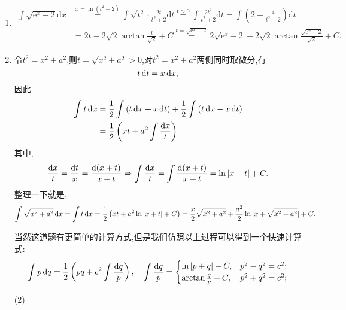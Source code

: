 \begin{solution}
    \begin{enumerate}
        \item \begin{align*}
                  \int \sqrt{\mathrm{e}^x - 2} \mathrm{d}x & \overset{x = \ln(t^2+2)}{=} \int \sqrt{t^2} \cdot \frac{2t}{t^2 + 2} \mathrm{d}t
                  \overset{t>0}{=} \int \frac{2t^2}{t^2 + 2} \mathrm{d}t = \int \left(2 - \frac{4}{t^2 + 2}\right) \mathrm{d}t                \\
                                                           & = 2t - 2\sqrt{2} \arctan \frac{t}{\sqrt{2}} + C
                  \overset{t = \sqrt{\mathrm{e}^x - 2}}{=} 2\sqrt{\mathrm{e}^x - 2} - 2\sqrt{2} \arctan \frac{\sqrt{\mathrm{e}^x - 2}}{\sqrt{2}} + C.
              \end{align*}
        \item 令$t^2 = x^2 + a^2$,则$t = \sqrt{x^2 + a^2}>0$,对$t^2 = x^2 + a^2$两侧同时取微分,有$$t \operatorname{d\!} t = x \operatorname{d\!} x,$$因此\begin{align*}
                  \int t \operatorname{d\!} x & = \frac{1}{2} \int\left( t \operatorname{d\!} x + x \operatorname{d\!} t\right) + \frac{1}{2} \int \left( t \operatorname{d\!} x - x \operatorname{d\!} t\right) \\
                                & = \frac{1}{2} \left( xt + a^2 \int \frac{\operatorname{d\!} x}{t} \right)
              \end{align*}
              其中,$$\frac{\operatorname{d\!} x}{t} = \frac{\operatorname{d\!} t}{x} = \frac{\operatorname{d} (x+t)}{x+t} \Rightarrow
                  \int \frac{\operatorname{d\!} x}{t} = \int \frac{\operatorname{d} (x+t)}{x+t} = \ln |x+t| + C.$$
              整理一下就是,
              $$\int \sqrt{x^2 + a^2} \operatorname{d\!} x = \int t \operatorname{d\!} x = \frac{1}{2} \left( xt + a^2 \ln|x+t| + C\right) = \frac{x}{2} \sqrt{x^2 + a^2} + \frac{a^2}{2} \ln |x + \sqrt{x^2 + a^2}| + C.$$
              \begin{remark}
                  当然这道题有更简单的计算方式,但是我们仿照以上过程可以得到一个快速计算式:
                  $$\int p \operatorname{d\!} q = \frac{1}{2} \left(pq + c^2 \int \frac{\operatorname{d\!} q}{p} \right), \quad \int \frac{\operatorname{d\!} q}{p} = \begin{cases}
                          \ln |p+q| + C,           & p^2 - q^2 = c^2; \\
                          \arctan \frac{q}{p} + C, & p^2 + q^2 = c^2; \\
                      \end{cases}$$
              \end{remark}
        \item[(2)]

\end{enumerate}
\end{solution}
